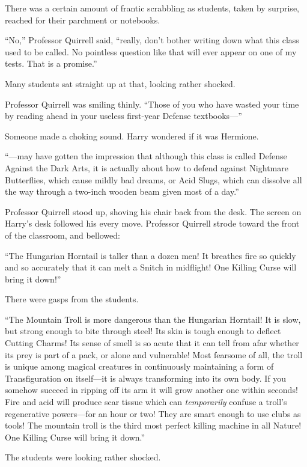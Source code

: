 There was a certain amount of frantic scrabbling as students, taken by surprise, reached for their parchment or notebooks.

“No,” Professor Quirrell said, “really, don’t bother writing down what this class used to be called. No pointless question like that will ever appear on one of my tests. That is a promise.”

Many students sat straight up at that, looking rather shocked.

Professor Quirrell was smiling thinly. “Those of you who have wasted your time by reading ahead in your useless first-year Defense textbooks—”

Someone made a choking sound. Harry wondered if it was Hermione.

“—may have gotten the impression that although this class is called Defense Against the Dark Arts, it is actually about how to defend against Nightmare Butterflies, which cause mildly bad dreams, or Acid Slugs, which can dissolve all the way through a two-inch wooden beam given most of a day.”

Professor Quirrell stood up, shoving his chair back from the desk. The screen on Harry’s desk followed his every move. Professor Quirrell strode toward the front of the classroom, and bellowed:

“The Hungarian Horntail is taller than a dozen men! It breathes fire so quickly and so accurately that it can melt a Snitch in midflight! One Killing Curse will bring it down!”

There were gasps from the students.

“The Mountain Troll is more dangerous than the Hungarian Horntail! It is slow, but strong enough to bite through steel! Its skin is tough enough to deflect Cutting Charms! Its sense of smell is so acute that it can tell from afar whether its prey is part of a pack, or alone and vulnerable! Most fearsome of all, the troll is unique among magical creatures in continuously maintaining a form of Transfiguration on itself—it is always transforming into its own body. If you somehow succeed in ripping off its arm it will grow another one within seconds! Fire and acid will produce scar tissue which can \emph{temporarily} confuse a troll’s regenerative powers—for an hour or two! They are smart enough to use clubs as tools! The mountain troll is the third most perfect killing machine in all Nature! One Killing Curse will bring it down.”

The students were looking rather shocked.

